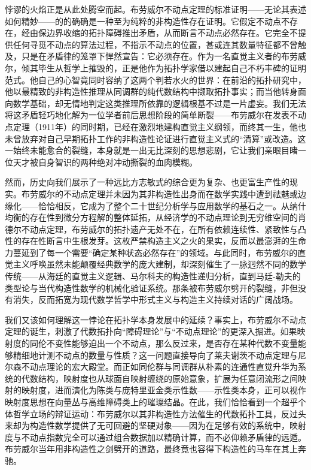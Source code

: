 \documentclass[12pt,a4paper]{article}
\begin{document}
悖谬的火焰正是从此处腾空而起。布劳威尔不动点定理的标准证明——无论其表述如何精妙——的的确确是一种至为纯粹的非构造性存在证明。它假定不动点不存在，经由保边界收缩的拓扑障碍推出矛盾，从而断言不动点必然存在。它完全不提供任何寻觅不动点的算法过程，不指示不动点的位置，甚或连其数量特征都不曾触及，只是在矛盾律的笼罩下悍然宣告：它必须存在。作为一名直觉主义者的布劳威尔，倾其毕生从哲学上摧毁的，正是他作为拓扑学家借以建起自己不朽丰碑的证明范式。他自己的心智竟同时容纳了这两个判若水火的世界：在前沿的拓扑研究中，他以最精致的非构造性推理从同调群的纯代数结构中撷取拓扑事实；而当他转身面向数学基础，却无情地判定这类推理所依靠的逻辑根基不过是一片虚妄。我们无法将这矛盾轻巧地化解为一位学者前后思想阶段的简单断裂——布劳威尔在发表不动点定理（1911年）的同时期，已经在激烈地建构直觉主义纲领，而终其一生，他也未曾放弃对自己早期拓扑工作的非构造性论证进行直觉主义式的“清算”或改造。这一始终未能愈合的裂缝，本身就是一出无比深刻的思想悲剧，它让我们亲眼目睹一位天才被自身智识的两种绝对冲动撕裂的血肉模糊。

然而，历史向我们展示了一种远比方志敏式的综合更为复杂、也更富生产性的现实。布劳威尔的不动点定理并未因为其非构造性出身而在数学实践中遭到祛魅或边缘化——恰恰相反，它成为了整个二十世纪分析学与应用数学的基石之一。从纳什均衡的存在性到微分方程解的整体延拓，从经济学的不动点理论到无穷维空间的肖德尔不动点定理，布劳威尔的拓扑遗产无处不在，在所有依赖连续性、紧致性与凸性的存在性断言中生根发芽。这枚严禁构造主义之火的果实，反而以最澎湃的生命力蔓延到了每一个需要“确定某种状态必然存在”的领域。与此同时，布劳威尔的直觉主义呼唤虽然未能颠覆经典数学的庞大建制，却深刻催生了一脉迥然不同的数学传统——从海廷的直觉主义逻辑、马尔科夫的构造性递归分析，直到马廷-勒夫的类型论与当代构造性数学的机械化验证系统。那条被布劳威尔劈开的裂缝，非但没有消失，反而拓宽为现代数学哲学中形式主义与构造主义持续对话的广阔战场。

我们又该如何理解这一悖论在拓扑学本身发展中的延续？事实上，布劳威尔不动点定理的诞生，刺激了代数拓扑向“障碍理论”与“不动点理论”的更深入掘进。如果映射度的同伦不变性能够迫出一个不动点，那么反过来，是否存在某种代数不变量能够精细地计测不动点的数量与性质？这一问题直接导向了莱夫谢茨不动点定理与尼尔森不动点理论的宏大殿堂。而正如同伦群与同调群从朴素的连通性直觉升华为系统的代数结构，映射度也从球面自映射缠绕的原始意象，扩展为任意闭流形之间映射的映射度，进而演化为陈类与庞特里亚金类示性数——示性类本身，正可以视作映射度思想在向量丛与高维障碍类上的璀璨结晶。在此，我们恰恰看到一个超乎个体哲学立场的辩证运动：布劳威尔以其非构造性方法催生的代数拓扑工具，反过头来却为构造性数学提供了无可回避的坚硬对象——因为在足够有效的系统中，映射度与不动点指数完全可以通过组合数据加以精确计算，而不必仰赖矛盾律的远遁。布劳威尔当年用非构造性之剑劈开的道路，最终竟也容得下构造性的马车在其上奔驰。
\end{document}
